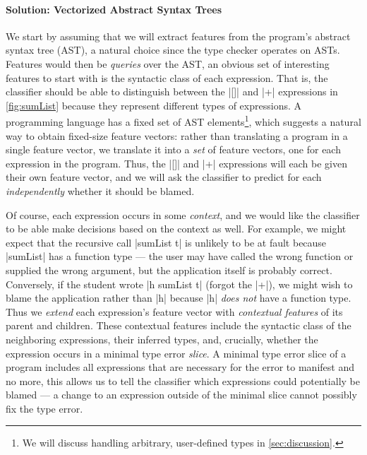 \paragraph{\textbf{Solution: Vectorized Abstract Syntax Trees}}
We start by assuming that we will extract features from the program's
abstract syntax tree (AST), a natural choice since the type checker
operates on ASTs.
%
Features would then be \emph{queries} over the AST, an obvious set of
interesting features to start with is the syntactic class of each
expression.
%
That is, the classifier should be able to distinguish between the |[]|
and |+| expressions in \autoref{fig:sumList} because they represent
different types of expressions.
%
A programming language has a fixed set of AST elements\footnote{We will
  discuss handling arbitrary, user-defined types in
  \autoref{sec:discussion}.}, which suggests a natural way to obtain
fixed-size feature vectors: rather than translating a program in a
single feature vector, we translate it into a \emph{set} of feature
vectors, one for each expression in the program.
%
Thus, the |[]| and |+| expressions will each be given their own feature
vector, and we will ask the classifier to predict for each
\emph{independently} whether it should be blamed.

Of course, each expression occurs in some \emph{context}, and we would
like the classifier to be able make decisions based on the context as
well.
%
For example, we might expect that the recursive call |sumList t| is
unlikely to be at fault because |sumList| has a function type --- the
user may have called the wrong function or supplied the wrong argument,
but the application itself is probably correct.
%
Conversely, if the student wrote |h sumList t| (\ie forgot the |+|), we
might wish to blame the application rather than |h| because |h|
\emph{does not} have a function type.
%
Thus we \emph{extend} each expression's feature vector with
\emph{contextual features} of its parent and children.
%
These contextual features include the syntactic class of the neighboring
expressions, their inferred types, and, crucially, whether the
expression occurs in a minimal type error \emph{slice}.
%
A minimal type error slice of a program includes all expressions that
are necessary for the error to manifest and no more, this allows us to
tell the classifier which expressions could potentially be blamed ---
a change to an expression outside of the minimal slice cannot possibly
fix the type error.

